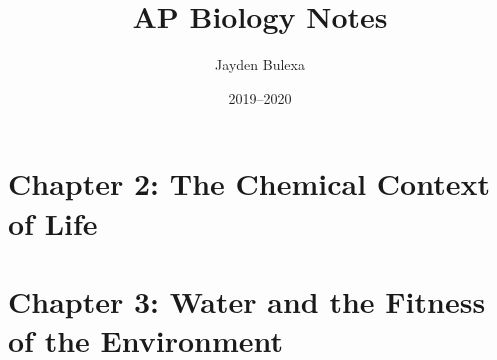 \documentclass{article}
\title{AP Biology Notes}
\author{Jayden Bulexa}
\date{2019--2020}
\begin{document}
\begin{titlepage}
	\maketitle
\end{titlepage}

\tableofcontents
\section{Chapter 2: The Chemical Context of Life}

\section{Chapter 3: Water and the Fitness of the Environment}

\end{document}
